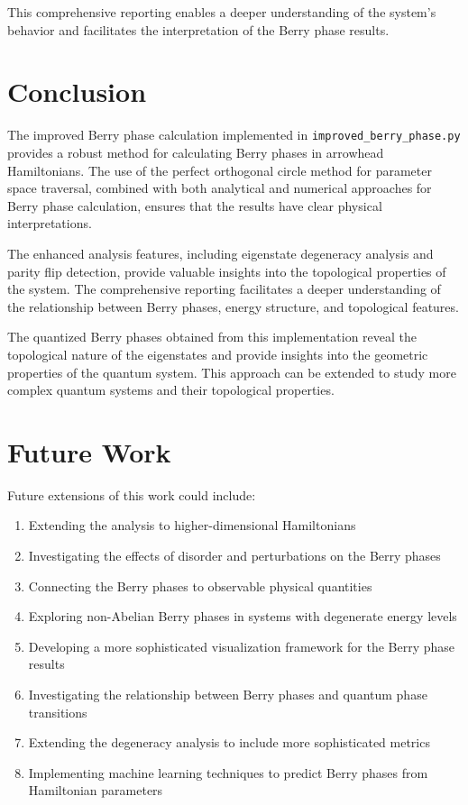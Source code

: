 \documentclass[12pt,a4paper]{article}
\begin{document}
This comprehensive reporting enables a deeper understanding of the system's behavior and facilitates the interpretation of the Berry phase results.

\section{Conclusion}

The improved Berry phase calculation implemented in \texttt{improved\_berry\_phase.py} provides a robust method for calculating Berry phases in arrowhead Hamiltonians. The use of the perfect orthogonal circle method for parameter space traversal, combined with both analytical and numerical approaches for Berry phase calculation, ensures that the results have clear physical interpretations.

The enhanced analysis features, including eigenstate degeneracy analysis and parity flip detection, provide valuable insights into the topological properties of the system. The comprehensive reporting facilitates a deeper understanding of the relationship between Berry phases, energy structure, and topological features.

The quantized Berry phases obtained from this implementation reveal the topological nature of the eigenstates and provide insights into the geometric properties of the quantum system. This approach can be extended to study more complex quantum systems and their topological properties.

\section{Future Work}

Future extensions of this work could include:

\begin{enumerate}
    \item Extending the analysis to higher-dimensional Hamiltonians
    \item Investigating the effects of disorder and perturbations on the Berry phases
    \item Connecting the Berry phases to observable physical quantities
    \item Exploring non-Abelian Berry phases in systems with degenerate energy levels
    \item Developing a more sophisticated visualization framework for the Berry phase results
    \item Investigating the relationship between Berry phases and quantum phase transitions
    \item Extending the degeneracy analysis to include more sophisticated metrics
    \item Implementing machine learning techniques to predict Berry phases from Hamiltonian parameters
\end{enumerate}
\end{document}

